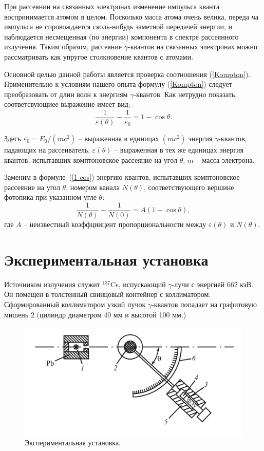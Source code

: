 \documentclass[a4paper, 12pt]{article}
\begin{document}
	При рассеянии на связанных электронах изменение импульса кванта воспринимается атомом в целом. Посколько масса атома очень велика, переда ча импульса не спровождается сколь-нибудь заметной передачей энергии, и наблюдается несмещенная (по энергии) компонента в спектре рассеянного излучения. Таким образом, рассеяние $\gamma$-квантов на связанных электронах можно рассматривать как упругое столкновение квантов с атомами.
	
	Основной целью данной работы является проверка соотношения (\ref{Kompton}). Применительно к условиям нашего опыта формулу (\ref{Kompton}) следует преобразовать от длин волн к энергиям $\gamma$-квантов. Как нетрудно показать, соответсвующиее выражение имеет вид:
	\begin{equation}
		\label{1-cos}
		\tag{$\star\star$}
		\frac{1}{\varepsilon(\theta)} - \frac{1}{\varepsilon_0} = 1 - \cos \theta.
	\end{equation}

	Здесь $\varepsilon_0 = E_0/(mc^2)$ -- выраженная в единицах $(mc^2)$ энергия $\gamma$-квантов, падающих на рассеиватель, $\varepsilon(\theta)$ -- выраженная в тех же единицах энергия квантов, испытавших комптоновское рассеяние на угол $\theta$, $m$ -- масса электрона.
	
	Заменим в формуле~(\ref{1-cos}) энергию квантов, испытавших комптоновское рассеяние на угол $\theta$, номером канала $N(\theta)$, соответствующего вершине фотопика при указанном угле $\theta$:
	\begin{equation}
		\label{kek}
		\tag{$\star \star \star$}
		\frac{1}{N(\theta)} - \frac{1}{N(0)} = A (1- \cos \theta),
	\end{equation}
	где $A$ -- неизвестный коэффциицент пропорциональности между $\varepsilon(\theta)$ и $N(\theta)$.

\section*{Экспериментальная установка}
	Источником излучения служит $^{137}$Cs, испускающий $\gamma$-лучи с энергией 662 кэВ. Он помещен в толстенный свинцовый контейнер с коллиматором. Сформированный коллиматором узкий пучок $\gamma$-квантов попадает на графитовую мишень 2 (цилиндр диаметром 40 мм и высотой 100 мм.)
	
	\begin{figure}[h!]
	    \centering
		\includegraphics[width=14cm]{ust.png}
		\caption{Экспериментальная установка.}
		\label{fig:ust}
	\end{figure}
	
\end{document}
